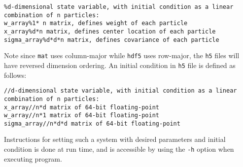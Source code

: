 \documentclass[10pt]{article} %
\begin{document}
\begin{lstlisting}
%d-dimensional state variable, with initial condition as a linear combination of n particles:
w_array%1* n matrix, defines weight of each particle
x_array%d*n matrix, defines center location of each particle
sigma_array%d*d*n matrix, defines covariance of each particle
\end{lstlisting}
Note since \texttt{mat} uses column-major while \texttt{hdf5} uses row-major, the \texttt{h5} files will have reversed dimension ordering. An initial condition in \texttt{h5} file is defined as follows:
\begin{lstlisting}
//d-dimensional state variable, with initial condition as a linear combination of n particles:
x_array//n*d matrix of 64-bit floating-point
w_array//n*1 matrix of 64-bit floating-point
sigma_array//n*d*d matrix of 64-bit floating-point
\end{lstlisting}

Instructions for setting such a system with desired parameters and initial condition is done at run time, and is accessible by using the \texttt{-h} option when executing program.
\end{document}
